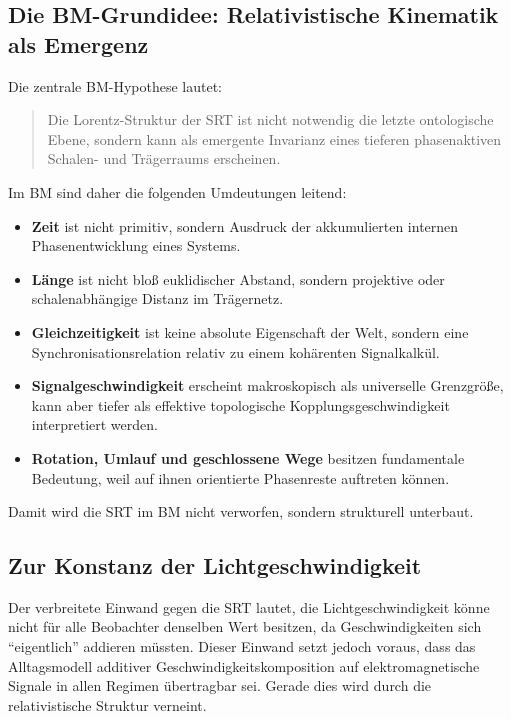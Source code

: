 \documentclass[12pt,a4paper]{article}
\begin{document}
	\subsection{Die BM-Grundidee: Relativistische Kinematik als Emergenz}
	
	Die zentrale BM-Hypothese lautet:
	
	\begin{quote}
		Die Lorentz-Struktur der SRT ist nicht notwendig die letzte ontologische Ebene, sondern kann als emergente Invarianz eines tieferen phasenaktiven Schalen- und Trägerraums erscheinen.
	\end{quote}
	
	Im BM sind daher die folgenden Umdeutungen leitend:
	
	\begin{itemize}
		\item \textbf{Zeit} ist nicht primitiv, sondern Ausdruck der akkumulierten internen Phasenentwicklung eines Systems.
		\item \textbf{Länge} ist nicht bloß euklidischer Abstand, sondern projektive oder schalenabhängige Distanz im Trägernetz.
		\item \textbf{Gleichzeitigkeit} ist keine absolute Eigenschaft der Welt, sondern eine Synchronisationsrelation relativ zu einem kohärenten Signalkalkül.
		\item \textbf{Signalgeschwindigkeit} erscheint makroskopisch als universelle Grenzgröße, kann aber tiefer als effektive topologische Kopplungsgeschwindigkeit interpretiert werden.
		\item \textbf{Rotation, Umlauf und geschlossene Wege} besitzen fundamentale Bedeutung, weil auf ihnen orientierte Phasenreste auftreten können.
	\end{itemize}
	
	Damit wird die SRT im BM nicht verworfen, sondern strukturell unterbaut.
	
	\subsection{Zur Konstanz der Lichtgeschwindigkeit}
	
	Der verbreitete Einwand gegen die SRT lautet, die Lichtgeschwindigkeit könne nicht für alle Beobachter denselben Wert besitzen, da Geschwindigkeiten sich ``eigentlich'' addieren müssten. Dieser Einwand setzt jedoch voraus, dass das Alltagsmodell additiver Geschwindigkeitskomposition auf elektromagnetische Signale in allen Regimen übertragbar sei. Gerade dies wird durch die relativistische Struktur verneint.
	
\end{document}
